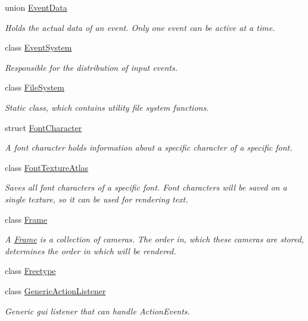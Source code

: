 \begin{DoxyCompactItemize}
union \mbox{\hyperlink{unionec_1_1_event_data}{Event\+Data}}
\begin{DoxyCompactList}\small\item\em Holds the actual data of an event. Only one event can be active at a time. \end{DoxyCompactList}\item 
class \mbox{\hyperlink{classec_1_1_event_system}{Event\+System}}
\begin{DoxyCompactList}\small\item\em Responsible for the distribution of input events. \end{DoxyCompactList}\item 
class \mbox{\hyperlink{classec_1_1_file_system}{File\+System}}
\begin{DoxyCompactList}\small\item\em Static class, which contains utility file system functions. \end{DoxyCompactList}\item 
struct \mbox{\hyperlink{structec_1_1_font_character}{Font\+Character}}
\begin{DoxyCompactList}\small\item\em A font character holds information about a specific character of a specific font. \end{DoxyCompactList}\item 
class \mbox{\hyperlink{classec_1_1_font_texture_atlas}{Font\+Texture\+Atlas}}
\begin{DoxyCompactList}\small\item\em Saves all font characters of a specific font. Font characters will be saved on a single texture, so it can be used for rendering text. \end{DoxyCompactList}\item 
class \mbox{\hyperlink{classec_1_1_frame}{Frame}}
\begin{DoxyCompactList}\small\item\em A \mbox{\hyperlink{classec_1_1_frame}{Frame}} is a collection of cameras. The order in, which these cameras are stored, determines the order in which will be rendered. \end{DoxyCompactList}\item 
class \mbox{\hyperlink{classec_1_1_freetype}{Freetype}}
\item 
class \mbox{\hyperlink{classec_1_1_generic_action_listener}{Generic\+Action\+Listener}}
\begin{DoxyCompactList}\small\item\em Generic gui listener that can handle Action\+Events. \end{DoxyCompactList}\item 

\end{DoxyCompactItemize}

